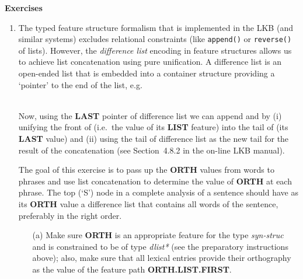 \documentclass[10pt]{article}
\newcommand{\att}[1]{{\mbox{\scriptsize {\bf #1}}}}
\begin{document}
\smallskip
\textbf{Exercises}
\begin{enumerate}
  \item The typed feature structure formalism that is implemented in
        the LKB (and similar systems) excludes relational constraints
        (like {\tt append()} or {\tt reverse()} of lists).  However,
        the {\em difference list\/} encoding in feature structures
        allows us to achieve list concatenation using pure
        unification.  A difference list is an open-ended list that is
        embedded into a container structure providing a `pointer' to
        the end of the list, e.g.\\
        \centerline{%
        \hspace{1cm}
        }\\
        Now, using the \att{LAST} pointer of difference list  we
        can append  and  by (i) unifying the front of
         (i.e.\ the value of its \att{LIST} feature) into the
        tail of  (its \att{LAST} value) and (ii) using the tail
        of difference list  as the new tail for the result of
        the concatenation (see Section~4.8.2 in the on-line LKB manual).
  \item []
        The goal of this exercise is to pass up the \att{ORTH} values
        from words to phrases and use list concatenation to determine
        the value of \att{ORTH} at each phrase.  The top (`S') node
        in a complete analysis of a sentence should have as its
        \att{ORTH} value a difference list that contains all words of
        the sentence, preferably in the right order.
        \begin{itemize}
          \item [(a)]
                Make sure \att{ORTH} is an appropriate feature for the
                type {\it syn-struc} and is constrained to be of type
                {\it *dlist*} (see the preparatory instructions
                above); also, make sure that all lexical entries
                provide their orthography as the value of the feature
                path \att{ORTH.LIST.FIRST}.

\end{itemize}
\end{enumerate}
\end{document}
